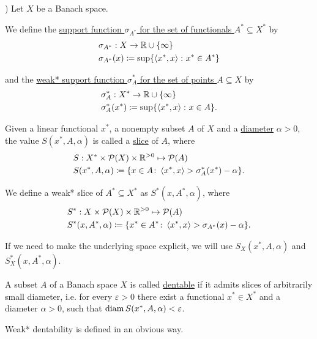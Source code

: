 \begin{definition}\cite[Example 3.2(a]{Phelps1993})
  \label{def:banach_support_function}
  Let $X$ be a Banach space.

  We define the \uline{support function $\sigma_{A^*}$ for the set of functionals $A^* \subseteq X^*$} by
  \begin{align*}
    &\sigma_{A^*}: X \to \mathbb R \cup \{ \infty \} \\
    &\sigma_{A^*}(x) \coloneqq \sup \{ \left\langle x^*, x \right\rangle \colon x^* \in A^* \}
  \end{align*}

  and the \uline{weak* support function $\sigma^*_A$ for the set of points $A \subseteq X$} by
  \begin{align*}
    &\sigma^*_A: X^* \to \mathbb R \cup \{ \infty \} \\
    &\sigma^*_A(x^*) \coloneqq \sup \{ \left\langle x^*, x \right\rangle \colon x \in A \}.
  \end{align*}
\end{definition}

\begin{definition}\cite[definition 2.17]{Phelps1993}
  \label{def:banach_slice}
  Given a linear functional $x^*$, a nonempty subset $A$ of $X$ and a \uline{diameter} $\alpha > 0$, the value $S(x^*, A, \alpha)$ is called a \uline{slice} of $A$, where
  \begin{align*}
    &S: X^* \times \operatorname{\mathcal P}(X) \times \mathbb R^{>0} \mapsto \operatorname{\mathcal P}(A) \\
    &S(x^*, A, \alpha) \coloneqq \{ x \in A \colon \left\langle x^*, x \right\rangle > \sigma_A^*(x^*) - \alpha \}.
  \end{align*}

  We define a weak* slice of $A^* \subseteq X^*$ as $S^*(x, A^*, \alpha)$, where
  \begin{align*}
    &S^*: X \times \operatorname{\mathcal P}(X) \times \mathbb R^{>0} \mapsto \operatorname{\mathcal P}(A) \\
    &S^*(x, A^*, \alpha) \coloneqq \{ x^* \in A^* \colon \left\langle x^*, x \right\rangle > \sigma_{A^*}(x) - \alpha \}.
  \end{align*}

  If we need to make the underlying space explicit, we will use $S_X(x^*, A, \alpha)$ and $S_X^*(x, A^*, \alpha)$.
\end{definition}

\begin{definition}\cite[definition 5.1]{Phelps1993}
  \label{def:dentability}
  A subset $A$ of a Banach space $X$ is called \uline{dentable} if it admits slices of arbitrarily small diameter, i.e. for every $\varepsilon > 0$ there exist a functional $x^* \in X^*$ and a diameter $\alpha > 0$, such that $\operatorname{diam} S(x^*, A, \alpha) < \varepsilon$.

  Weak* dentability is defined in an obvious way.
\end{definition}

